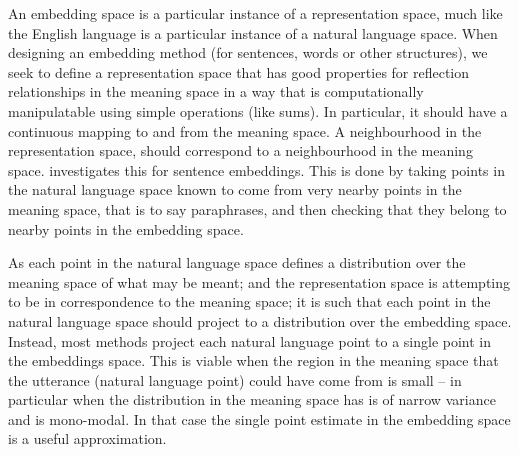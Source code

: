 \documentclass{book}
\begin{document}
An embedding space is a particular instance of a representation space, 
much like the English language is a particular instance of a natural language space.
When designing an embedding method (for sentences, words or other structures),
we seek to define a representation space
that has good properties for reflection relationships in the meaning space in a way that is computationally manipulatable using simple operations (like sums).
In particular, it should have a continuous mapping to and from the meaning space.
A neighbourhood in the representation space, should correspond to a neighbourhood in the meaning space.
 investigates this for sentence embeddings.
This is done by taking points in the natural language space known to come from very nearby points in the meaning space, that is to say paraphrases,
and then checking that they belong to nearby points in the embedding space.


As each point in the natural language space defines a distribution over the meaning space of what may be meant;
and the representation space is attempting to be in correspondence to the meaning space;
it is such that each point in the natural language space should project to a distribution over the embedding space.
Instead, most methods project each natural language point to a single point in the embeddings space.
This is viable when the region in the meaning space that the utterance (natural language point) could have come from is small -- in particular when the distribution in the meaning space has is of narrow variance and is mono-modal.
In that case the single point estimate in the embedding space is a useful approximation.
\end{document}
